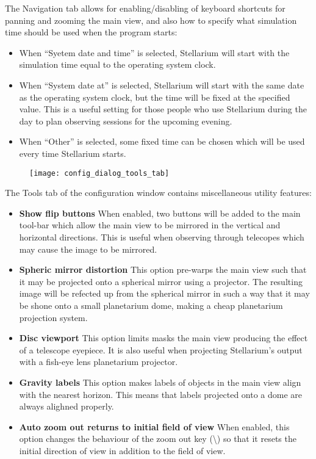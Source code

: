 The Navigation tab allows for enabling/disabling of keyboard shortcuts
for panning and zooming the main view, and also how to specify what
simulation time should be used when the program starts:

\begin{itemize}
\item
  When ``Syetem date and time'' is selected, Stellarium will start with
  the simulation time equal to the operating system clock.
\item
  When ``System date at'' is selected, Stellarium will start with the
  same date as the operating system clock, but the time will be fixed at
  the specified value. This is a useful setting for those people who use
  Stellarium during the day to plan observing sessions for the upcoming
  evening.
\item
  When ``Other'' is selected, some fixed time can be chosen which will
  be used every time Stellarium starts.
\end{itemize}

\begin{figure}[h]
\centering\texttt{[image: config\_dialog\_tools\_tab]}
\end{figure}

The Tools tab of the configuration window contains miscellaneous utility
features:

\begin{itemize}
\item
  \textbf{Show flip buttons} When enabled, two buttons will be added to
  the main tool-bar which allow the main view to be mirrored in the
  vertical and horizontal directions. This is useful when observing
  through telecopes which may cause the image to be mirrored.
\item
  \textbf{Spheric mirror distortion} This option pre-warps the main view
  such that it may be projected onto a spherical mirror using a
  projector. The resulting image will be refected up from the spherical
  mirror in such a way that it may be shone onto a small planetarium
  dome, making a cheap planetarium projection system.
\item
  \textbf{Disc viewport} This option limits masks the main view
  producing the effect of a telescope eyepiece. It is also useful when
  projecting Stellarium's output with a fish-eye lens planetarium
  projector.
\item
  \textbf{Gravity labels} This option makes labels of objects in the
  main view align with the nearest horizon. This means that labels
  projected onto a dome are always alighned properly.
\item
  \textbf{Auto zoom out returns to initial field of view} When enabled,
  this option changes the behaviour of the zoom out key
  (\textbackslash{}) so that it resets the initial direction of view in
  addition to the field of view.
\end{itemize}

